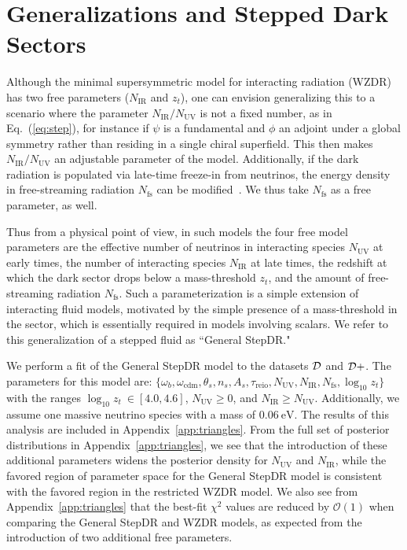 \documentclass[aps,prd,twocolumn,nofootinbib,superscriptaddress]{revtex4}
\newcommand{\eV}{\text{eV}}
\newcommand{\order}[1]{\mathcal{O}{(#1)}}
\newcommand{\D}{\cal{D}}
\newcommand{\Eq}[1]{Eq.~(\ref{eq:#1})}
\newcommand{\App}[1]{Appendix~\ref{app:#1}}
\newcommand{\nir}{N_\text{IR}}
\newcommand{\nuv}{N_\text{UV}}
\newcommand{\nfs}{N_\text{fs}}
\newcommand{\zt}{z_t}
\begin{document}
\section{Generalizations and Stepped Dark Sectors}
\label{sec:4param}

Although the minimal supersymmetric model for interacting radiation (WZDR) has two free parameters ($\nir$ and $z_t$), one can envision generalizing this to a scenario where the parameter $N_\text{IR} / N_\text{UV}$ is not a fixed number, as in \Eq{step}, for instance if $\psi$ is a fundamental and $\phi$ an adjoint under a global symmetry rather than residing in a single chiral superfield. This then makes $N_\text{IR} / N_\text{UV}$ an adjustable parameter of the model. Additionally, if the dark radiation is populated via late-time freeze-in from neutrinos, the energy density in free-streaming radiation $\nfs$ can be modified~\cite{Berlin:2017ftj, Berlin:2018ztp}. We thus take $\nfs$ as a free parameter, as well.

Thus from a physical point of view, in such models the four free model parameters are the effective number of neutrinos in interacting species $\nuv$ at early times, the number of interacting species  $\nir$ at late times, the redshift at which the dark sector drops below a mass-threshold $z_t$, and the amount of free-streaming radiation $\nfs$. Such a parameterization is a simple extension of interacting fluid models, motivated by the simple presence of a mass-threshold in the sector, which is essentially required in models involving scalars. We refer to this generalization of a stepped fluid as ``General StepDR."

We perform a fit of the General StepDR model to the datasets  $\D$ and $\D+$.  The parameters for this model are: $\{ \omega_b,\omega_\mathrm{cdm}, \theta_s, n_s,A_s, \tau_\mathrm{reio},\nuv, \nir, \nfs, \log_{10} \zt \} $ with the ranges  $\log_{10} \zt \ \in [4.0, 4.6]$, $ \nuv \geq 0 $, and $ \nir \geq \nuv $. Additionally, we assume one massive neutrino species with a mass of $0.06 \ \eV$. The results of this analysis are included in \App{triangles}. From the full set of posterior distributions in \App{triangles}, we see that the introduction of these additional parameters widens the posterior density for $\nuv$ and $\nir$, while the favored region of parameter space for the General StepDR model is consistent with the favored region in the restricted WZDR model. We also see from \App{triangles} that the best-fit $\chi^2$ values are reduced by $\order{1}$ when comparing the General StepDR and WZDR models, as expected from the introduction of two additional free parameters.
\end{document}
